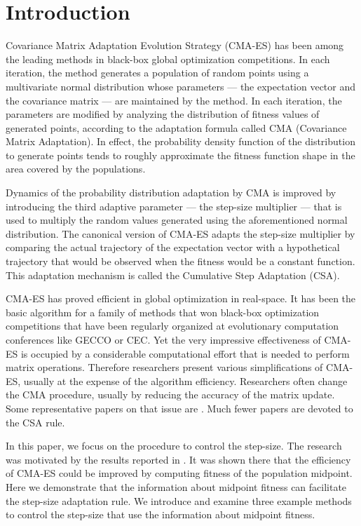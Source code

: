 \documentclass[runningheads,a4paper]{llncs}
\begin{document}
\section{Introduction}


Covariance Matrix Adaptation Evolution Strategy (CMA-ES) \cite{HansenOstermeier01} has been among the leading methods in black-box global optimization competitions. In each iteration, the method generates a population of random points using a multivariate normal distribution whose parameters --- the expectation vector and the covariance matrix --- are maintained by the method. In each iteration, the parameters are modified by analyzing the distribution of fitness values of generated points, according to the adaptation formula called CMA (Covariance Matrix Adaptation). In effect, the probability density function of the distribution to generate points tends to roughly approximate the fitness function shape in the area covered by the populations. 

Dynamics of the probability distribution adaptation by CMA is improved by introducing the third adaptive parameter --- the step-size multiplier --- that is used to multiply the random values generated using the aforementioned normal distribution. The canonical version of CMA-ES adapts the step-size multiplier by comparing the actual trajectory of the expectation vector with a hypothetical trajectory that would be observed when the fitness would be a constant function. This adaptation mechanism is called the Cumulative Step Adaptation (CSA).

CMA-ES has proved efficient in global optimization in real-space. It has been the basic algorithm for a family of methods that won black-box optimization competitions that have been regularly organized at evolutionary computation conferences like GECCO or CEC. Yet the very impressive effectiveness of CMA-ES is occupied by a considerable computational effort that is needed to perform matrix operations. Therefore researchers present various simplifications of CMA-ES, usually at the expense of the algorithm efficiency. Researchers often change the CMA procedure, usually by reducing the accuracy of the matrix update. Some representative papers on that issue are \cite{Poland2001,Loshchilov2017,SMAES}. Much fewer papers are devoted to the CSA rule.   

In this paper, we focus on the procedure to control the step-size. The research was motivated by the results reported in \cite{Arabas17,Biedrzycki17}. It was shown there that the efficiency of CMA-ES could be improved by computing fitness of the population midpoint. Here we demonstrate that the information about midpoint fitness can facilitate the step-size adaptation rule. We introduce and examine three example methods to control the step-size that use the information about midpoint fitness. 
\end{document}
